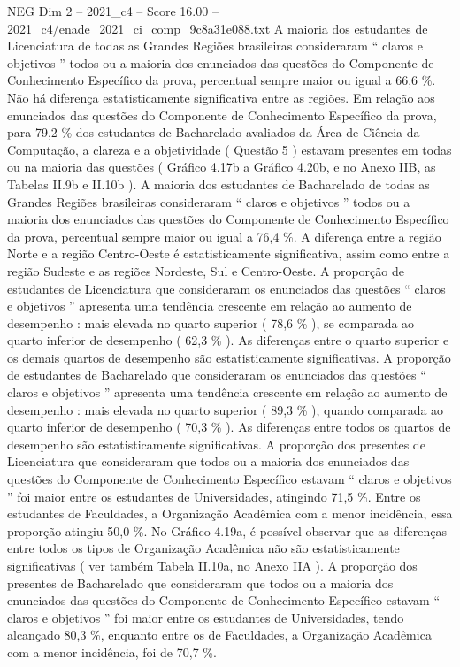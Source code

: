 \begin{textsample}{NEG Dim 2 – 2021\_c4 – Score 16.00 – 2021\_c4/enade\_2021\_ci\_comp\_9c8a31e088.txt}
A maioria dos estudantes de Licenciatura de todas as Grandes Regiões brasileiras consideraram “ claros e objetivos ” todos ou a maioria dos enunciados das questões do Componente de Conhecimento Específico da prova, percentual sempre maior ou igual a 66,6 \%.
Não há diferença estatisticamente significativa entre as regiões.
Em relação aos enunciados das questões do Componente de Conhecimento Específico da prova, para 79,2 \% dos estudantes de Bacharelado avaliados da Área de Ciência da Computação, a clareza e a objetividade ( Questão 5 ) estavam presentes em todas ou na maioria das questões ( Gráfico 4.17b a Gráfico 4.20b, e no Anexo IIB, as Tabelas II.9b e II.10b ).
A maioria dos estudantes de Bacharelado de todas as Grandes Regiões brasileiras consideraram “ claros e objetivos ” todos ou a maioria dos enunciados das questões do Componente de Conhecimento Específico da prova, percentual sempre maior ou igual a 76,4 \%.
A diferença entre a região Norte e a região Centro-Oeste é estatisticamente significativa, assim como entre a região Sudeste e as regiões Nordeste, Sul e Centro-Oeste.
A proporção de estudantes de Licenciatura que consideraram os enunciados das questões “ claros e objetivos ” apresenta uma tendência crescente em relação ao aumento de desempenho : mais elevada no quarto superior ( 78,6 \% ), se comparada ao quarto inferior de desempenho ( 62,3 \% ).
As diferenças entre o quarto superior e os demais quartos de desempenho são estatisticamente significativas.
A proporção de estudantes de Bacharelado que consideraram os enunciados das questões “ claros e objetivos ” apresenta uma tendência crescente em relação ao aumento de desempenho : mais elevada no quarto superior ( 89,3 \% ), quando comparada ao quarto inferior de desempenho ( 70,3 \% ).
As diferenças entre todos os quartos de desempenho são estatisticamente significativas.
A proporção dos presentes de Licenciatura que consideraram que todos ou a maioria dos enunciados das questões do Componente de Conhecimento Específico estavam “ claros e objetivos ” foi maior entre os estudantes de Universidades, atingindo 71,5 \%.
Entre os estudantes de Faculdades, a Organização Acadêmica com a menor incidência, essa proporção atingiu 50,0 \%.
No Gráfico 4.19a, é possível observar que as diferenças entre todos os tipos de Organização Acadêmica não são estatisticamente significativas ( ver também Tabela II.10a, no Anexo IIA ).
A proporção dos presentes de Bacharelado que consideraram que todos ou a maioria dos enunciados das questões do Componente de Conhecimento Específico estavam “ claros e objetivos ” foi maior entre os estudantes de Universidades, tendo alcançado 80,3 \%, enquanto entre os de Faculdades, a Organização Acadêmica com a menor incidência, foi de 70,7 \%.

\end{textsample}
